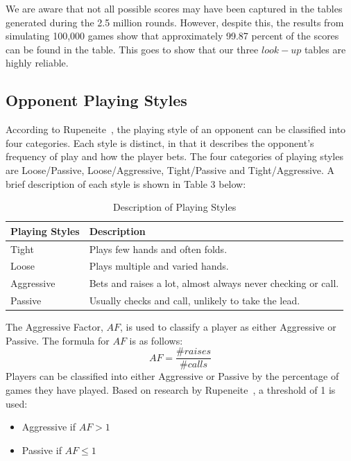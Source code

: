 \documentclass{article}
\begin{document}
\noindent We are aware that not all possible scores may have been captured in the tables generated during the 2.5 million rounds. However, despite this, the results from simulating 100,000 games show that approximately 99.87 percent of the scores can be found in the table. This goes to show that our three $look-up$ tables are highly reliable.

\subsection{Opponent Playing Styles}

According to Rupeneite~, the playing style of an opponent can be classified into four categories. Each style is distinct, in that it describes the opponent's frequency of play and how the player bets. The four categories of playing styles are Loose/Passive, Loose/Aggressive, Tight/Passive and Tight/Aggressive. A brief description of each style is shown in Table 3 below:

\begin{table}[h!]
  \begin{center}
    \begin{tabular}{|l|p{5cm}|}
    \hline
      \textbf{Playing Styles} & \textbf{Description} \\
      \hline
      Tight & Plays few hands and often folds. \\
      \hline
      Loose & Plays multiple and varied hands.  \\
      \hline
      Aggressive &  Bets and raises a lot, almost always never checking or call. \\
      \hline
      Passive & Usually checks and call, unlikely to take the lead. \\
      \hline
    \end{tabular}
    \caption{Description of Playing Styles}
    \label{tab:table3}
  \end{center}
\end{table}
The Aggressive Factor, $AF$, is used to classify a player as either Aggressive or Passive. The formula for $AF$ is as follows:
\begin{displaymath}
  AF = \frac{\text{\# }raises}{\text{\# }calls}
\end{displaymath}
\noindent Players can be classified into either Aggressive or Passive by the percentage of games they have played. Based on research by Rupeneite~, a threshold of 1 is used:
\begin{itemize}
	\item Aggressive if $AF > 1$
	\item Passive if $AF \leq 1$
\end{itemize}
\end{document}

